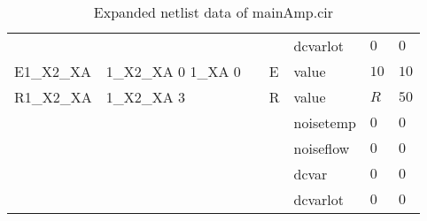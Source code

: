 \begin{table}[H]
\begin{tabular}[c]{lllllll}
\rowcolor{myyellow}
 & & & &\small{dcvarlot} &$0$ &$0$ \\ 
\small{E1\_X2\_XA} &\small{1\_X2\_XA 0 1\_XA 0 } & &\small{E} &\small{value} &$10$ &$10$ \\ 
\rowcolor{myyellow}
\small{R1\_X2\_XA} &\small{1\_X2\_XA 3 } & &\small{R} &\small{value} &$R$ &$50$ \\ 
 & & & &\small{noisetemp} &$0$ &$0$ \\ 
\rowcolor{myyellow}
 & & & &\small{noiseflow} &$0$ &$0$ \\ 
 & & & &\small{dcvar} &$0$ &$0$ \\ 
\rowcolor{myyellow}
 & & & &\small{dcvarlot} &$0$ &$0$ \\ 
\end{tabular}
\caption{Expanded netlist data of mainAmp.cir}
\end{table}

